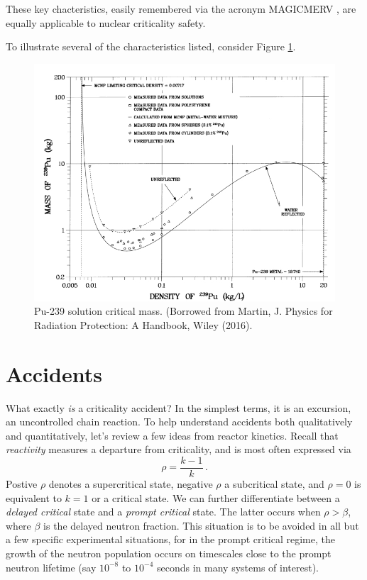 These key chacteristics, easily remembered via the acronym 
MAGICMERV \cite{handbook}, are equally applicable to nuclear
criticality safety.  

To illustrate several of the characteristics listed, consider Figure 
\ref{fig:pu_critical_mass}.

\begin{figure}[ht] 
    \centering
    \includegraphics[keepaspectratio, width = 5.0 in]{images/pu_critical_mass}
    \caption{Pu-239 solution critical mass. (Borrowed from Martin, J. {
             Physics for Radiation Protection: A Handbook}, Wiley (2016).}
    \label{fig:pu_critical_mass}
\end{figure}


\section*{Accidents}

What exactly \textit{is} a criticality accident?  In the simplest terms,
it is an excursion, an uncontrolled chain reaction.  To help understand
accidents
both qualitatively and quantitatively, let's review a few ideas from
reactor kinetics.  Recall that \textit{reactivity} measures a departure
from criticality, and is most often expressed via
\begin{equation}
 \rho = \frac{k-1}{k} \, .
\end{equation}
Postive $\rho$ denotes a supercritical state, negative $\rho$ a 
subcritical state, and $\rho = 0$ is equivalent to $k=1$ or a 
critical state.  We can further differentiate between a \textit{delayed
critical} state and a \textit{prompt critical} state.  The latter 
occurs when $\rho > \beta$, where $\beta$ is the delayed neutron
fraction.  This situation is to be avoided in all but a few specific
experimental situations, for in the prompt critical regime, 
the growth of the neutron population occurs on timescales close
to the prompt neutron lifetime (say $10^{-8}$ to $10^{-4}$ seconds in many
systems of interest).  

